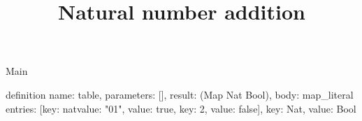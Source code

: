 \begin{lexlean}{Main}
\title{Natural number addition}
\begin{semanticmodule}
definition{
  name: table,
  parameters: [],
  result: (Map Nat Bool),
  body: map_literal{
    entries: [{key: nat{value: "01"}, value: true}, {key: 2, value: false}],
    key: Nat,
    value: Bool
  }
}
\end{semanticmodule}
\end{lexlean}
